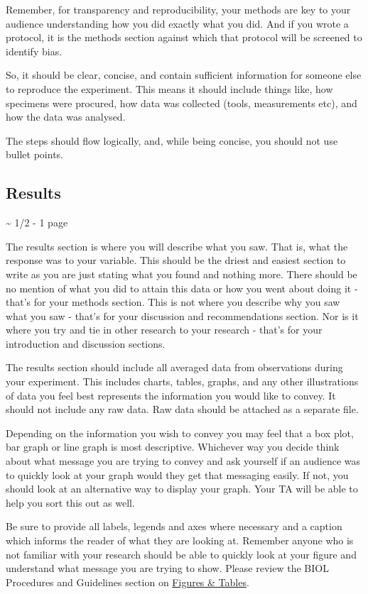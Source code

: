 \documentclass[
]{book}
\begin{document}
Remember, for transparency and reproducibility, your methods are key to your audience understanding how you did exactly what you did. And if you wrote a protocol, it is the methods section against which that protocol will be screened to identify bias.

So, it should be clear, concise, and contain sufficient information for someone else to reproduce the experiment. This means it should include things like, how specimens were procured, how data was collected (tools, measurements etc), and how the data was analysed.

The steps should flow logically, and, while being concise, you should not use bullet points.

\hypertarget{results}{%
\subsection*{Results}\label{results}}

\textasciitilde{} 1/2 - 1 page

The results section is where you will describe what you saw. That is, what the response was to your variable. This should be the driest and easiest section to write as you are just stating what you found and nothing more. There should be no mention of what you did to attain this data or how you went about doing it - that's for your methods section. This is not where you describe why you saw what you saw - that's for your discussion and recommendations section. Nor is it where you try and tie in other research to your research - that's for your introduction and discussion sections.

The results section should include all averaged data from observations during your experiment. This includes charts, tables, graphs, and any other illustrations of data you feel best represents the information you would like to convey. It should not include any raw data. Raw data should be attached as a separate file.

Depending on the information you wish to convey you may feel that a box plot, bar graph or line graph is most descriptive. Whichever way you decide think about what message you are trying to convey and ask yourself if an audience was to quickly look at your graph would they get that messaging easily. If not, you should look at an alternative way to display your graph. Your TA will be able to help you sort this out as well.

Be sure to provide all labels, legends and axes where necessary and a caption which informs the reader of what they are looking at. Remember anyone who is not familiar with your research should be able to quickly look at your figure and understand what message you are trying to show. Please review the BIOL Procedures and Guidelines section on \href{https://ubco-biology.github.io/Procedures-and-Guidelines/figures-tables.html}{Figures \& Tables}.
\end{document}
